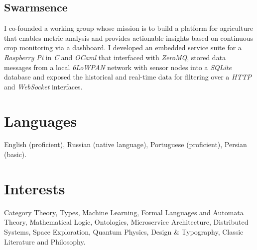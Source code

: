\documentclass{resume}
\begin{document}
\subsection{\bfseries Swarmsence}
I co-founded a working group whose mission is to build a platform for agriculture that enables metric analysis and provides actionable insights based on continuous crop monitoring via a dashboard. I developed an embedded service suite for a {\em Raspberry Pi} in {\em C} and {\em OCaml} that interfaced with {\em ZeroMQ}, stored data messages from a local {\em 6LoWPAN} network with sensor nodes into a {\em SQLite} database and exposed the historical and real-time data for filtering over a {\em HTTP} and {\em WebSocket} interfaces.



\section{\Palatino\bfseries Languages}
English (proficient), Russian (native language), Portuguese (proficient), Persian (basic).


\section{\Palatino\bfseries Interests}
Category Theory, Types, Machine Learning, Formal Languages and Automata Theory, Mathematical Logic, Ontologies, Microservice Architecture, Distributed Systems, Space Exploration, Quantum Physics, Design \& Typography, Classic Literature and Philosophy.
\end{document}
